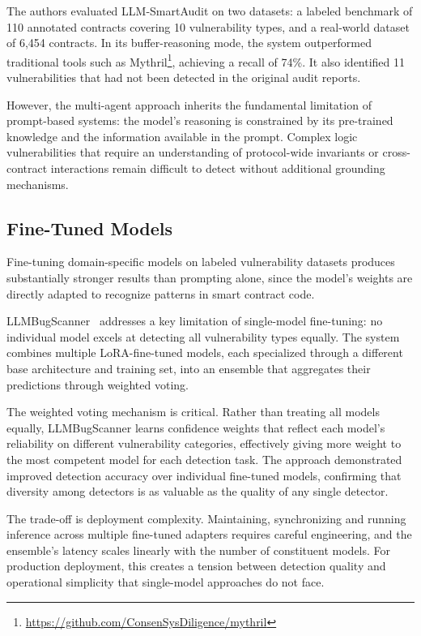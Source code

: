 The authors evaluated LLM-SmartAudit on two datasets: a labeled benchmark of 110 annotated contracts covering 10 vulnerability types, and a real-world dataset of 6{,}454 contracts. In its buffer-reasoning mode, the system outperformed traditional tools such as Mythril\footnote{\url{https://github.com/ConsenSysDiligence/mythril}}, achieving a recall of 74\%. It also identified 11 vulnerabilities that had not been detected in the original audit reports.

However, the multi-agent approach inherits the fundamental limitation of prompt-based systems: the model's reasoning is constrained by its pre-trained knowledge and the information available in the prompt. Complex logic vulnerabilities that require an understanding of protocol-wide invariants or cross-contract interactions remain difficult to detect without additional grounding mechanisms.

\subsection{Fine-Tuned Models}
\label{subsec:fine-tuned}

Fine-tuning domain-specific models on labeled vulnerability datasets produces substantially stronger results than prompting alone, since the model's weights are directly adapted to recognize patterns in smart contract code.

LLMBugScanner~\cite{yuan2025large} addresses a key limitation of single-model fine-tuning: no individual model excels at detecting all vulnerability types equally. The system combines multiple LoRA-fine-tuned models, each specialized through a different base architecture and training set, into an ensemble that aggregates their predictions through weighted voting.

The weighted voting mechanism is critical. Rather than treating all models equally, LLMBugScanner learns confidence weights that reflect each model's reliability on different vulnerability categories, effectively giving more weight to the most competent model for each detection task. The approach demonstrated improved detection accuracy over individual fine-tuned models, confirming that diversity among detectors is as valuable as the quality of any single detector.

The trade-off is deployment complexity. Maintaining, synchronizing and running inference across multiple fine-tuned adapters requires careful engineering, and the ensemble's latency scales linearly with the number of constituent models. For production deployment, this creates a tension between detection quality and operational simplicity that single-model approaches do not face.

